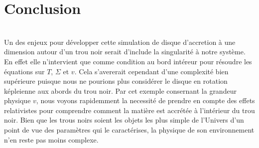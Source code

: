 \section*{Conclusion}


 \\


Un des enjeux pour développer cette simulation de disque d'accretion à une dimension autour d'un trou noir serait d'include la singularité à notre système. En effet elle n'intervient que comme condition au bord intéreur pour résoudre les équations sur $T$, $\Sigma$ et $v$. Cela s'avererait cependant d'une complexité bien supérieure puisque nous ne pourions plus considérer le disque en rotation képleienne aux abords du trou noir. Par cet exemple consernant la grandeur physique $v$, nous voyons rapidemment la necessité de prendre en compte des effets relativistes pour comprendre comment la matière est accrétée à l'intérieur du trou noir. Bien que les trous noirs soient les objets les plus simple de l'Univers d'un point de vue des paramètres qui le caractérises, la physique de son environnement n'en reste pas moins complexe. 